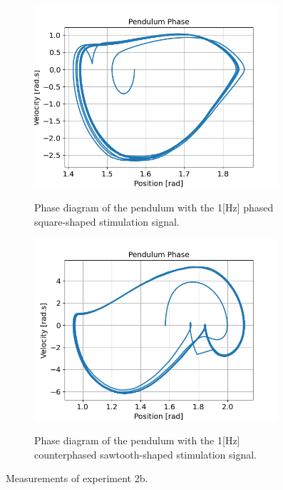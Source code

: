 \documentclass{cmc}
\begin{document}
\begin{figure}[H]
  \begin{subfigure}[b]{0.48\textwidth}
    { \centering
      \includegraphics[width=0.99\textwidth]{figures/2b_sawtooth_phased.png} }
    \caption{Phase diagram of the pendulum with the 1[Hz] phased square-shaped stimulation signal.}
    \label{fig:2b_square_signal}
  \end{subfigure}
  \begin{subfigure}[b]{0.48\textwidth}
    { \centering
      \includegraphics[width=0.99\textwidth]{figures/2b_sawtooth_counterphased.png} }
    \caption{Phase diagram of the pendulum with the 1[Hz] counterphased sawtooth-shaped stimulation signal.}
    \label{fig:2b_square_signal}
  \end{subfigure}
  \caption{Measurements of experiment 2b.}
  \label{fig:2b}
\end{figure}
\end{document}
